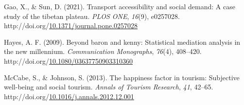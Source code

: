 \documentclass[
11pt, %
oneside, %
english, %
singlespacing, %
]{macthesis} %
\newlength{\cslhangindent}
\newenvironment{CSLReferences}[2] %
{\begin{list}{}{%
	\setlength{\itemindent}{0pt}
	\setlength{\leftmargin}{0pt}
	\setlength{\parsep}{0pt}
	\ifodd #1
	\setlength{\leftmargin}{\cslhangindent}
	\setlength{\itemindent}{-1\cslhangindent}
	\fi
	\setlength{\itemsep}{#2\baselineskip}}}
{\end{list}}
\begin{document}
\begin{CSLReferences}{1}{0}
Gao, X., \& Sun, D. (2021). Transport accessibility and social demand: A case study of the tibetan plateau. \emph{PLOS ONE}, \emph{16}(9), e0257028. http://doi.org/\href{https://doi.org/10.1371/journal.pone.0257028}{10.1371/journal.pone.0257028}

Hayes, A. F. (2009). Beyond baron and kenny: Statistical mediation analysis in the new millennium. \emph{Communication Monographs}, \emph{76}(4), 408--420. http://doi.org/\href{https://doi.org/10.1080/03637750903310360}{10.1080/03637750903310360}

McCabe, S., \& Johnson, S. (2013). The happiness factor in tourism: Subjective well-being and social tourism. \emph{Annals of Tourism Research}, \emph{41}, 42--65. http://doi.org/\href{https://doi.org/10.1016/j.annals.2012.12.001}{10.1016/j.annals.2012.12.001}

\end{CSLReferences}
\end{document}
